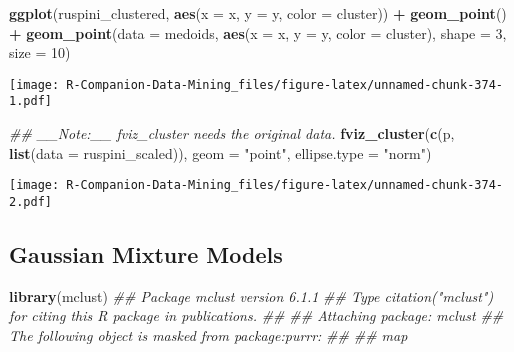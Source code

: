 \documentclass[
  notitlepage]{book}
\newenvironment{Shaded}{\begin{snugshade}}{\end{snugshade}}
\newcommand{\CommentTok}[1]{\textcolor[rgb]{0.56,0.35,0.01}{\textit{#1}}}
\newcommand{\DataTypeTok}[1]{\textcolor[rgb]{0.13,0.29,0.53}{#1}}
\newcommand{\DecValTok}[1]{\textcolor[rgb]{0.00,0.00,0.81}{#1}}
\newcommand{\KeywordTok}[1]{\textcolor[rgb]{0.13,0.29,0.53}{\textbf{#1}}}
\newcommand{\NormalTok}[1]{#1}
\newcommand{\OperatorTok}[1]{\textcolor[rgb]{0.81,0.36,0.00}{\textbf{#1}}}
\newcommand{\StringTok}[1]{\textcolor[rgb]{0.31,0.60,0.02}{#1}}
\begin{document}
\begin{Shaded}
\begin{Highlighting}[]
\KeywordTok{ggplot}\NormalTok{(ruspini\_clustered, }\KeywordTok{aes}\NormalTok{(}\DataTypeTok{x =}\NormalTok{ x, }\DataTypeTok{y =}\NormalTok{ y, }\DataTypeTok{color =}\NormalTok{ cluster)) }\OperatorTok{+}\StringTok{ }
\StringTok{  }\KeywordTok{geom\_point}\NormalTok{() }\OperatorTok{+}
\StringTok{  }\KeywordTok{geom\_point}\NormalTok{(}\DataTypeTok{data =}\NormalTok{ medoids, }\KeywordTok{aes}\NormalTok{(}\DataTypeTok{x =}\NormalTok{ x, }\DataTypeTok{y =}\NormalTok{ y, }\DataTypeTok{color =}\NormalTok{ cluster), }
             \DataTypeTok{shape =} \DecValTok{3}\NormalTok{, }\DataTypeTok{size =} \DecValTok{10}\NormalTok{)}
\end{Highlighting}
\end{Shaded}

\texttt{[image: R-Companion-Data-Mining\_files/figure-latex/unnamed-chunk-374-1.pdf]}

\begin{Shaded}
\begin{Highlighting}[]
\CommentTok{\#\# \_\_Note:\_\_ \textasciigrave{}fviz\_cluster\textasciigrave{} needs the original data.}
\KeywordTok{fviz\_cluster}\NormalTok{(}\KeywordTok{c}\NormalTok{(p, }\KeywordTok{list}\NormalTok{(}\DataTypeTok{data =}\NormalTok{ ruspini\_scaled)), }
             \DataTypeTok{geom =} \StringTok{"point"}\NormalTok{, }
             \DataTypeTok{ellipse.type =} \StringTok{"norm"}\NormalTok{)}
\end{Highlighting}
\end{Shaded}

\texttt{[image: R-Companion-Data-Mining\_files/figure-latex/unnamed-chunk-374-2.pdf]}

\hypertarget{gaussian-mixture-models}{%
\subsection{Gaussian Mixture Models}\label{gaussian-mixture-models}}

\begin{Shaded}
\begin{Highlighting}[]
\KeywordTok{library}\NormalTok{(mclust)}
\CommentTok{\#\# Package \textquotesingle{}mclust\textquotesingle{} version 6.1.1}
\CommentTok{\#\# Type \textquotesingle{}citation("mclust")\textquotesingle{} for citing this R package in publications.}
\CommentTok{\#\# }
\CommentTok{\#\# Attaching package: \textquotesingle{}mclust\textquotesingle{}}
\CommentTok{\#\# The following object is masked from \textquotesingle{}package:purrr\textquotesingle{}:}
\CommentTok{\#\# }
\CommentTok{\#\#     map}
\end{Highlighting}
\end{Shaded}
\end{document}
